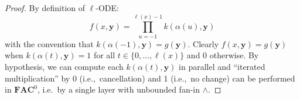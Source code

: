 \documentclass[11pt, oneside]{article}
\newcommand{\fun}[1]{\mathsf{#1}}
\newcommand{\Nat}{\mathbb{N}}
\newcommand{\AC}{\mathbf{FAC}}
\newcommand{\tu}[1]{\mathbf{#1}}
\newtheorem{lemma}{Lemma}
\theoremstyle{definition}
\newtheorem{defn}{Definition}
\newtheorem{remark}{Remark}
\begin{document}
\begin{toappendix}
%
\begin{proof}
    By definition of $\ell$-ODE:
    $$
        f(x, \tu y) = \prod^{\ell(x)-1}_{u=-1} k(\alpha(u), \tu y)
    $$
    with the convention that $k(\alpha(-1), \tu y)=g(\tu y)$.
    Clearly $f(x, \tu y)=g(\tu y)$ when $k(\alpha(t), \tu y)=1$ for all $t\in \{0, \dots, \ell(x)\}$ and 0 otherwise.
    By hypothesis, we can compute each $k(\alpha(t), \tu y)$ in parallel and ``iterated multiplication'' by 0 (i.e.,~cancellation) and 1 (i.e.,~no change) can be performed in $\AC^0$, i.e.~by a single layer with unbounded fan-in $\wedge$.
\end{proof}
%
%

\end{toappendix}
\end{document}
